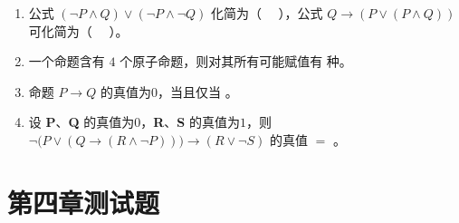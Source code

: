 \begin{enumerate}
	\item 公式 $(\neg P\land Q)\lor(\neg P\land \neg Q)$ 化简为（ \ \ ），公式 $Q\to(P\lor(P\land Q))$ 可化简为（ \ \ ）。
	
	\item 一个命题含有 $4$ 个原子命题，则对其所有可能赋值有 \underline{\hspace{6em}} 种。
	
	\item 命题 $P\to Q$ 的真值为$0$，当且仅当 \underline{\hspace{8em}}。
	
	\item 设 \textbf{P}、\textbf{Q} 的真值为$0$，\textbf{R}、\textbf{S} 的真值为$1$，则 $\neg\bigl(P\lor(Q\to(R\land \neg P))\bigr)\to(R\lor \neg S)$ 的真值 $=$ \underline{\hspace{8em}}。
\end{enumerate}


\newpage
\section{第四章测试题}

